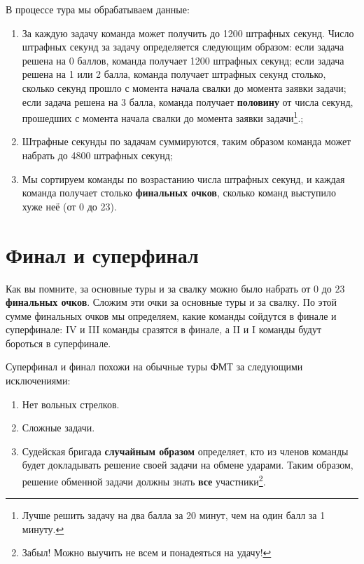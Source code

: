 \documentclass[12pt]{article}
\begin{document}
В процессе тура мы обрабатываем данные:
\begin{enumerate}
	\item За каждую задачу команда может получить до 1200 штрафных секунд. Число штрафных секунд за задачу определяется следующим образом: если задача решена на 0 баллов, команда получает 1200 штрафных секунд; если задача решена на 1 или 2 балла, команда получает штрафных секунд столько, сколько секунд прошло с момента начала свалки до момента заявки задачи; если задача решена на 3 балла, команда получает {\bf половину} от числа секунд, прошедших с момента начала свалки до момента заявки задачи\footnote{Лучше решить задачу на два балла за 20 минут, чем на один балл за 1 минуту.}.;
	\item Штрафные секунды по задачам суммируются, таким образом команда может набрать до 4800 штрафных секунд;
	\item Мы сортируем команды по возрастанию числа штрафных секунд, и каждая команда получает столько {\bf финальных очков}, сколько команд выступило хуже неё (от 0 до 23).
\end{enumerate}

\section*{Финал и суперфинал}
Как вы помните, за основные туры и за свалку можно было набрать от $0$ до $23$ {\bf финальных очков}. Сложим эти очки за основные туры и за свалку. По этой сумме финальных очков мы определяем, какие команды сойдутся в финале и суперфинале: IV и III команды сразятся в финале, а II и I команды будут бороться в суперфинале.

Суперфинал и финал похожи на обычные туры ФМТ за следующими исключениями:
\begin{enumerate}
\item Нет вольных стрелков.
\item Сложные задачи.
\item Судейская бригада {\bf случайным образом} определяет, кто из членов команды будет докладывать решение своей задачи на обмене ударами. Таким образом, решение обменной задачи должны знать {\bf все} участники\footnote{Забыл! Можно выучить не всем и понадеяться на удачу!}.
\end{enumerate}
\end{document}
